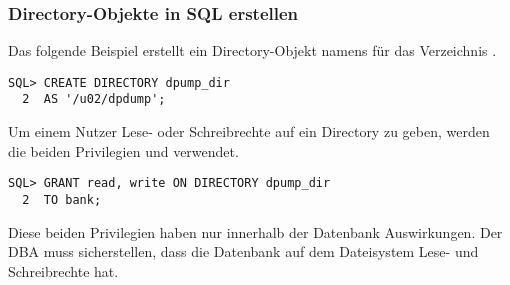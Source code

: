         \subsubsection{Directory-Objekte in SQL erstellen}
          Das folgende Beispiel erstellt ein Directory-Objekt namens
           f\"ur das Verzeichnis
          .
        \begin{lstlisting}[caption={Beispiel f\"ur \languageorasql{CREATE DIRECTORY}},label=admin900,language=oracle_sql]
SQL> CREATE DIRECTORY dpump_dir
  2  AS '/u02/dpdump';
          \end{lstlisting}
          Um einem Nutzer Lese- oder Schreibrechte auf ein Directory zu geben, werden die beiden Privilegien  und  verwendet.
          \begin{lstlisting}[caption={Zugriff auf ein Directory gew\"ahren},label=grantondirectory,language=oracle_sql]
SQL> GRANT read, write ON DIRECTORY dpump_dir
  2  TO bank;
          \end{lstlisting}
          Diese beiden Privilegien haben nur innerhalb der Datenbank Auswirkungen. Der DBA muss sicherstellen, dass die Datenbank auf dem Dateisystem Lese- und Schreibrechte hat.
          \begin{literaturinternet}
            \item \cite{sthref4351}
          \end{literaturinternet}

